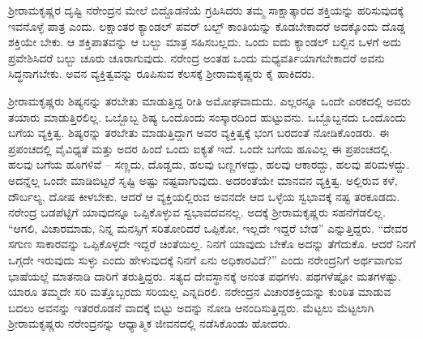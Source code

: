 \vskip 2pt

ಶ‍್ರೀರಾಮಕೃಷ್ಣರ ದೃಷ್ಟಿ ನರೇಂದ್ರನ ಮೇಲೆ ಬಿದ್ದೊಡನೆಯೆ ಗ್ರಹಿಸಿದರು ತಮ್ಮ ಸಾಕ್ಷಾತ್ಕಾರದ ಶಕ್ತಿಯನ್ನು ಹರಿಸುವುದಕ್ಕೆ ಇವನೊಳ್ಳೆ ಪಾತ್ರ ಎಂದು. ಲಕ್ಷಾಂತರ ಕ್ಯಾಂಡಲ್ ಪವರ್ ಬಲ್ಬ್ ಕಾಂತಿಯನ್ನು ಕೊಡಬೇಕಾದರೆ ಅದಕ್ಕೊಂದು ದೊಡ್ಡ ಶಕ್ತಿಯೇ ಬೇಕು. ಆ ಶಕ್ತಿಪಾತವನ್ನು ಆ ಬಲ್ಬು ಮಾತ್ರ ಸಹಿಸಬಲ್ಲದು. ಒಂದು ಐದು ಕ್ಯಾಂಡಲ್ ಬಲ್ಬಿನ ಒಳಗೆ ಅದು ಪ್ರವೇಶಿಸಿದರೆ ಬಲ್ಬು ಚೂರು ಚೂರಾಗುವುದು. ನರೇಂದ್ರ ಅಂತಹ ಒಂದು ಮಧ್ಯವರ್ತಿಯಾಗಬೇಕಾದರೆ ಅವನು ಸಿದ್ಧನಾಗಬೇಕು. ಅವನ ವ್ಯಕ್ತಿತ್ವವನ್ನು ರೂಪಿಸುವ ಕೆಲಸಕ್ಕೆ ಶ‍್ರೀರಾಮಕೃಷ್ಣರು ಕೈ ಹಾಕಿದರು.

\vskip 2pt

ಶ‍್ರೀರಾಮಕೃಷ್ಣರು ಶಿಷ್ಯನನ್ನು ತರಬೇತು ಮಾಡುತ್ತಿದ್ದ ರೀತಿ ಅಮೋಘವಾದುದು. ಎಲ್ಲರನ್ನೂ ಒಂದೇ ಎರಕದಲ್ಲಿ ಅವರು ತಯಾರು ಮಾಡುತ್ತಿರಲಿಲ್ಲ. ಒಬ್ಬೊಬ್ಬ ಶಿಷ್ಯ ಒಂದೊಂದು ಸಂಸ್ಕಾರದಿಂದ ಹುಟ್ಟುವನು. ಒಬ್ಬೊಬ್ಬನದು ಒಂದೊಂದು ಬಗೆಯ ವ್ಯಕ್ತಿತ್ವ. ಶಿಷ್ಯರನ್ನು ತರಬೇತು ಮಾಡುತ್ತಿದ್ದಾಗ ಅವರ ವ್ಯಕ್ತಿತ್ವಕ್ಕೆ ಭಂಗ ಬರದಂತೆ ನೋಡಿಕೊಂಡರು. ಈ ಪ್ರಪಂಚದಲ್ಲಿ ವೈವಿಧ್ಯತೆ ಮತ್ತು ಅದರ ಹಿಂದೆ ಒಂದು ಐಕ್ಯತೆ ಇದೆ. ಒಂದೇ ಬಗೆಯ ಹೂವಿಲ್ಲ ಈ ಪ್ರಪಂಚದಲ್ಲಿ. ಹಲವು ಬಗೆಯ ಹೂಗಳಿವೆ – ಸಣ್ಣದು, ದೊಡ್ಡದು, ಹಲವು ಬಣ್ಣಗಳದ್ದು, ಹಲವು ಆಕಾರದ್ದು, ಹಲವು ಪರಿಮಳದ್ದು. ಅದನ್ನೆಲ್ಲ ಒಂದೇ ಮಾಡಿಬಿಟ್ಟರೆ ಸೃಷ್ಟಿ ಅಷ್ಟು ನಷ್ಟವಾಗುವುದು. ಅದರಂತೆಯೇ ಮಾನವನ ವ್ಯಕ್ತಿತ್ವ. ಅಲ್ಲಿರುವ ಕಳೆ, ದೌರ್ಬಲ್ಯ, ದೋಷ ಕೀಳಬೇಕು. ಆದರೆ ಆ ವ್ಯಕ್ತಿಯಲ್ಲಿರುವ ಅವನದೇ ಆದ ಒಳ್ಳೆಯ ಸ್ವಭಾವಕ್ಕೆ ನಷ್ಟ ತರಕೂಡದು. ನರೇಂದ್ರ ಬಡಪೆಟ್ಟಿಗೆ ಯಾವುದನ್ನೂ ಒಪ್ಪಿಕೊಳ್ಳುವ ಸ್ವಭಾವದವನಲ್ಲ. ಅದಕ್ಕೆ ಶ‍್ರೀರಾಮಕೃಷ್ಣರು ಸಹನೆಗೆಡಲಿಲ್ಲ. “ಆಗಲಿ, ವಿಚಾರಮಾಡು, ನಿನ್ನ ಮನಸ್ಸಿಗೆ ಸರಿತೋರಿದರೆ ಒಪ್ಪಿಕೋ, ಇಲ್ಲದೇ ಇದ್ದರೆ ಬೇಡ” ಎನ್ನುತ್ತಿದ್ದರು. “ದೇವರ ಸಗುಣ ಸಾಕಾರವನ್ನು ಒಪ್ಪಿಕೊಳ್ಳದೇ ಇದ್ದರೆ ಚಿಂತೆಯಿಲ್ಲ. ನಿನಗೆ ಯಾವುದು ಬೇಕೊ ಅದನ್ನು ತೆಗೆದುಕೊ. ಆದರೆ ನಿನಗೆ ಒಗ್ಗದೇ ಇರುವುದು ಸುಳ್ಳು ಎಂದು ಹೇಳುವುದಕ್ಕೆ ನಿನಗೆ ಏನು ಅಧಿಕಾರವಿದೆ?” ಎಂದು ನರೇಂದ್ರನಿಗೆ ಅರ್ಥವಾಗುವ ಭಾಷೆಯಲ್ಲೆ ಮಾತನಾಡಿ ದಾರಿಗೆ ತರುತ್ತಿದ್ದರು. ಸತ್ಯದ ದೇವಸ್ಥಾನಕ್ಕೆ ಅನಂತ ಪಥಗಳು. ಪಥಗಳೆಷ್ಟೋ ಮತಗಳಷ್ಟು. ಯಾರೂ ತಮ್ಮದೇ ಸರಿ ಮತ್ತೊಬ್ಬರದು ಸರಿಯಲ್ಲ ಎನ್ನದಿರಲಿ. ನರೇಂದ್ರನ ವಿಚಾರಶಕ್ತಿಯನ್ನು ಕುಂಠಿತ ಮಾಡುವ ಬದಲು ಅವನನ್ನು ಇತರರೊಡನೆ ವಾದಕ್ಕೆ ಬಿಟ್ಟು ಅದನ್ನು ನೋಡಿ ಆನಂದಿಸುತ್ತಿದ್ದರು. ಮೆಟ್ಟಲು ಮೆಟ್ಟಲಾಗಿ ಶ‍್ರೀರಾಮಕೃಷ್ಣರು ನರೇಂದ್ರನನ್ನು ಆಧ್ಯಾತ್ಮಿಕ ಜೀವನದಲ್ಲಿ ನಡೆಸಿಕೊಂಡು ಹೋದರು.

